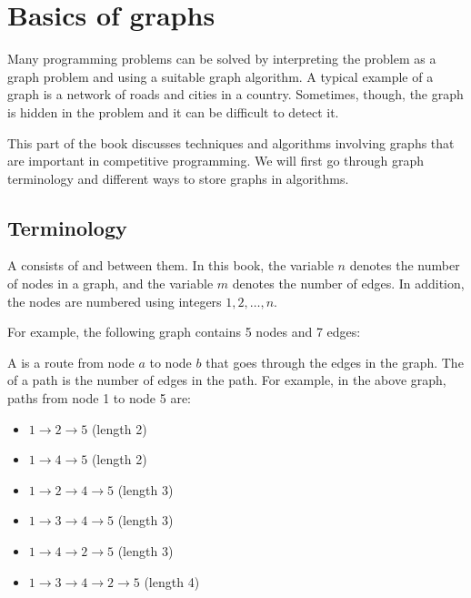 \chapter{Basics of graphs}

Many programming problems can be solved by
interpreting the problem as a graph problem
and using a suitable graph algorithm.
A typical example of a graph is a network
of roads and cities in a country.
Sometimes, though, the graph is hidden
in the problem and it can be difficult to detect it.

This part of the book discusses techniques and algorithms
involving graphs
that are important in competitive programming.
We will first go through graph terminology
and different ways to store graphs in algorithms.

\section{Terminology}


A  consists of 
and  between them.
In this book,
the variable $n$ denotes the number of nodes
in a graph, and the variable $m$ denotes
the number of edges.
In addition, the nodes are numbered
using integers $1,2,\ldots,n$.

For example, the following graph contains 5 nodes and 7 edges:

\begin{center}
\end{center}


A  is a route from node $a$ to node $b$
that goes through the edges in the graph.
The  of a path is the number of
edges in the path.
For example, in the above graph, paths
from node 1 to node 5 are:

\begin{itemize}
\item $1 \rightarrow 2 \rightarrow 5$ (length 2)
\item $1 \rightarrow 4 \rightarrow 5$ (length 2)
\item $1 \rightarrow 2 \rightarrow 4 \rightarrow 5$ (length 3)
\item $1 \rightarrow 3 \rightarrow 4 \rightarrow 5$ (length 3)
\item $1 \rightarrow 4 \rightarrow 2 \rightarrow 5$ (length 3)
\item $1 \rightarrow 3 \rightarrow 4 \rightarrow 2 \rightarrow 5$ (length 4)
\end{itemize}

